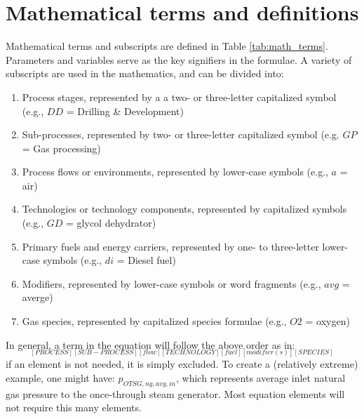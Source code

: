 \documentclass[11pt]{report}
\begin{document}
{{{{%

\chapter{Mathematical terms and definitions}

Mathematical terms and subscripts are defined in Table \ref{tab:math_terms}. Parameters and variables serve as the key signifiers in the formulae. A variety of subscripts are used in the mathematics, and can be divided into: 
\begin{enumerate}
\item Process stages, represented by a a two- or three-letter capitalized symbol (e.g., $DD$ = Drilling \& Development)
\item Sub-processes, represented by two- or three-letter capitalized symbol (e.g. $GP$ = Gas processing)
\item Process flows or environments, represented by lower-case symbols (e.g., $a$ = air)
\item Technologies or technology components, represented by capitalized symbols (e.g., $GD$ = glycol dehydrator)
\item Primary fuels and energy carriers, represented by one- to three-letter lower-case symbols (e.g., $di$ = Diesel fuel)
\item Modifiers, represented by lower-case symbols or word fragments (e.g., $avg$ = averge)
\item Gas species, represented by capitalized species formulae (e.g., $O2$ = oxygen)
\end{enumerate} 
In general, a term in the equation will follow the above order as in:
\begin{equation}
[Param]_{[PROCESS][SUB-PROCESS][flow][TECHNOLOGY][fuel][modifier(s)][SPECIES]}
\end{equation}
if an element is not needed, it is simply excluded. To create a (relatively extreme) example, one might have: $p_{OTSG,ng,avg,in}$, which represents average inlet natural gas pressure to the once-through steam generator. Most equation elements will not require this many elements.

\clearpage
\begin{scriptsize}
\tablelasttail{\bottomrule}
\label{tab:math_terms}
\begin{supertabular*}{1\columnwidth}{p{0.2\columnwidth}p{0.75\columnwidth}}


\end{supertabular*}
\end{scriptsize}}}}}
\end{document}
